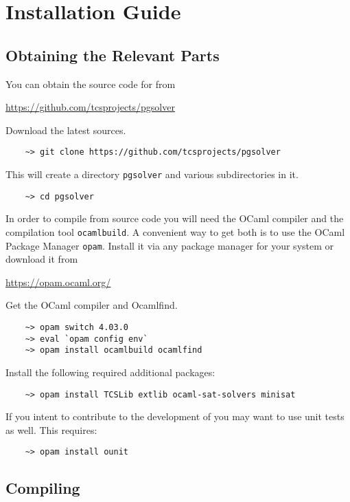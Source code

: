\section{Installation Guide}

\subsection{Obtaining the Relevant Parts}

You can obtain the source code for \pgsolver from
\begin{center}
    \url{https://github.com/tcsprojects/pgsolver}
\end{center}
Download the latest sources.
\begin{verbatim}
    ~> git clone https://github.com/tcsprojects/pgsolver
\end{verbatim}
This will create a directory \texttt{pgsolver} and various subdirectories in it.
\begin{verbatim}
    ~> cd pgsolver
\end{verbatim}

In order to compile \pgsolver from source code you will need the OCaml compiler and the compilation tool \texttt{ocamlbuild}. A convenient way to get
both is to use the OCaml Package Manager \texttt{opam}. Install it via any package manager for your system or download it from
\begin{center}
\url{https://opam.ocaml.org/}
\end{center}
Get the OCaml compiler and Ocamlfind.
\begin{verbatim}
    ~> opam switch 4.03.0 
    ~> eval `opam config env`
    ~> opam install ocamlbuild ocamlfind
\end{verbatim}

Install the following required additional packages:
\begin{verbatim}
    ~> opam install TCSLib extlib ocaml-sat-solvers minisat
\end{verbatim}

If you intent to contribute to the development of \pgsolver you may want to use unit tests as well. This requires:
\begin{verbatim}
    ~> opam install ounit
\end{verbatim}



\subsection{Compiling \pgsolver}

